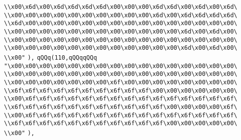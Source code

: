 \verb|\\x00\x6d\x00\x6d\x6d\x6d\x6d\x00\x00\x00\x6d\x6d\x00\x6d\x00\x6d\|\newline
\verb|\\x00\x00\x00\x00\x00\x00\x00\x00\x00\x00\x6d\x00\x6d\x6d\x6d\x6d\|\newline
\verb|\\x6d\x00\x00\x00\x00\x00\x00\x00\x00\x00\x00\x00\x00\x00\x00\x00\|\newline
\verb|\\x00\x00\x00\x00\x00\x00\x00\x00\x00\x00\x00\x00\x6d\x00\x6d\x00\|\newline
\verb|\\x00\x00\x00\x00\x00\x00\x00\x00\x00\x00\x00\x00\x00\x00\x00\x00\|\newline
\verb|\\x00\x00\x00\x00\x00\x00\x00\x00\x00\x00\x00\x00\x6d\x00\x6d\x00\|\newline
\verb|\\x00"|\newline
\verb|),|\newline
\verb|qQQq(110,qQQqqQQq|\newline
\verb|"\x00\x00\x00\x00\x00\x00\x00\x00\x00\x00\x00\x00\x00\x00\x00\x00\|\newline
\verb|\\x00\x00\x00\x00\x00\x00\x00\x00\x00\x00\x00\x00\x00\x00\x00\x00\|\newline
\verb|\\x00\x00\x00\x00\x00\x00\x00\x6f\x00\x00\x00\x00\x00\x00\x00\x00\|\newline
\verb|\\x6f\x6f\x6f\x6f\x6f\x6f\x6f\x6f\x6f\x6f\x00\x00\x00\x00\x00\x00\|\newline
\verb|\\x00\x6f\x6f\x6f\x6f\x6f\x6f\x6f\x6f\x6f\x6f\x6f\x6f\x6f\x6f\x6f\|\newline
\verb|\\x6f\x6f\x6f\x6f\x6f\x6f\x6f\x6f\x6f\x6f\x6f\x00\x00\x00\x00\x6f\|\newline
\verb|\\x00\x6f\x6f\x6f\x6f\x6f\x6f\x6f\x6f\x6f\x6f\x6f\x6f\x6f\x6f\x6f\|\newline
\verb|\\x6f\x6f\x6f\x6f\x6f\x6f\x6f\x6f\x6f\x6f\x6f\x00\x00\x00\x00\x00\|\newline
\verb|\\x00"|\newline
\verb|),|\newline
